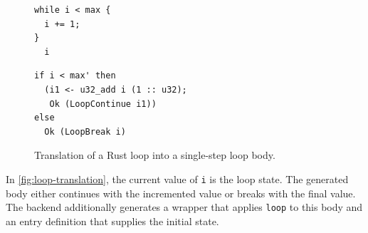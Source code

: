 \begin{figure}[!ht]
\centering
\begin{minipage}{0.88\linewidth}
\begin{minipage}[t]{0.36\linewidth}
\vspace{0pt}
\begin{verbatim}
while i < max {
  i += 1;
}
  i
\end{verbatim}
\end{minipage}
\hfill
\vrule{}
\hfill
\begin{minipage}[t]{0.56\linewidth}
\vspace{0pt}
\begin{verbatim}
if i < max' then
  (i1 <- u32_add i (1 :: u32);
   Ok (LoopContinue i1))
else
  Ok (LoopBreak i)
\end{verbatim}
\end{minipage}
\end{minipage}
\caption{Translation of a Rust loop into a single-step loop body.}
\label{fig:loop-translation}
\end{figure}



In \autoref{fig:loop-translation}, the current value of \texttt{i} is the loop state. The generated body either continues with the incremented value or breaks with the final value. The backend additionally generates a wrapper that applies \texttt{loop} to this body and an entry definition that supplies the initial state.

